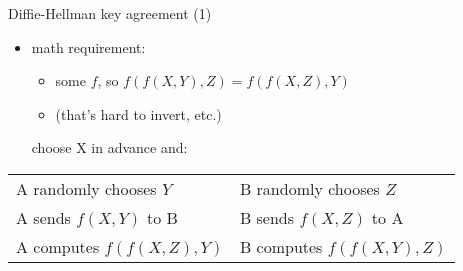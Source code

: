 \begin{frame}{Diffie-Hellman key agreement (1)}
    \begin{itemize}
    \item math requirement:
        \begin{itemize}
        \item some $f$, so $f(f(X, Y), Z) = f(f(X, Z), Y)$
        \item (that's hard to invert, etc.)
        \end{itemize}
    choose X in advance and:
    \end{itemize}
\begin{tabular}{l|l}
A randomly chooses $Y$ & B randomly chooses $Z$ \\
A sends $f(X, Y)$ to B & B sends $f(X, Z)$ to A \\
A computes $f(f(X, Z), Y)$ & B computes $f(f(X, Y), Z)$ \\
\end{tabular}
\end{frame}

